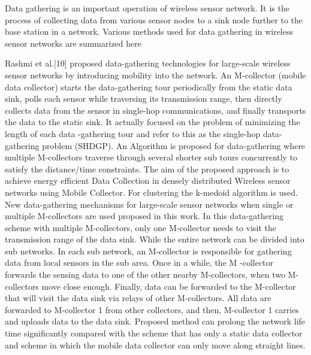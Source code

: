 \documentclass[MTech]{iitmdiss}
\begin{document}
Data gathering is an important operation of wireless sensor network. It is the process of collecting data from various sensor nodes to a sink node further to the base station in a network. Various methods used for data gathering in wireless sensor networks are summarized here


Rashmi et al.[10] proposed  data-gathering technologies for large-scale  wireless sensor networks by introducing mobility into the network. An M-collector (mobile data collector) starts  the data-gathering tour periodically from the static data sink, polls each sensor while  traversing its 
transmission range, then directly collects data from the sensor in single-hop communications, and finally  transports the data to the static sink. It actually focused  on the problem of minimizing the length of each data -gathering tour and refer to this as the single-hop data-gathering problem (SHDGP).
An Algorithm is proposed for  data-gathering  where multiple M-collectors traverse through several shorter sub tours concurrently to satisfy the  distance/time constraints. The aim of the proposed approach  is to achieve energy efficient Data Collection in densely distributed Wireless sensor  networks using Mobile Collector. For clustering the k-medoid algorithm is used. New data-gathering mechanisms for large-scale sensor networks when single or multiple M-collectors are used proposed in this work. In this data-gathering scheme with multiple M-collectors, only one M-collector needs to visit the transmission  range of the data sink. While the entire network can be divided into sub networks. In each sub network, an M-collector is responsible for gathering data  from local sensors in the sub area. Once in a while, the M -collector forwards the sensing data to one of the other nearby M-collectors, when two M-collectors move close enough. Finally, data can be forwarded to the M-collector that will visit the data sink via relays of other M-collectors. All 
data are forwarded to M-collector 1 from other collectors, and then, M-collector 1 carries and uploads data to the data sink. Proposed method can prolong the network life time significantly compared with the scheme that has only a static data collector and scheme in which the mobile data collector can only move along straight lines.
\end{document}
